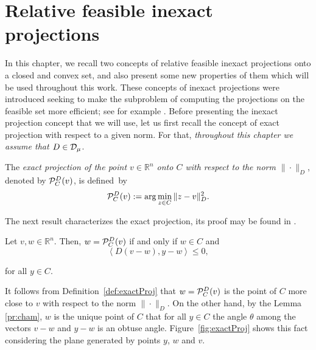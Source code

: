 \chapter{Relative feasible inexact projections} \label{chap:SubInexProj}
\thispagestyle{empty}



In this chapter, we recall two concepts  of relative feasible inexact projections onto a closed and convex set, and  also  present  some  new properties of them which will be used throughout this work. These  concepts  of inexact projections were    introduced seeking to make the subproblem of computing the projections on the feasible  set more efficient;  see for example \cite{BirginMartinezRaydan2003,SalzoVilla2012,VillaSalzo2013}. Before presenting the  inexact projection concept that we will use, let us first recall the concept of exact projection with respect to a given  norm.  For that, {\it throughout this chapter we assume that $D\in {\cal D}_{\mu}$}.

\begin{definition} \label{def:exactProj}
	The {\it exact  projection of the point $v\in \mathbb{R}^{n}$ onto $C$ with respect to the norm $\| \cdot \| _{D}$}, denoted by  ${\cal P}_{C}^{D}(v)$, is  defined~by
	\begin{equation}\label{eq:exactM}
		{\cal P}_{C}^{D}(v):=\arg \min _{z\in C}\|z-v\|^2_{D}.
	\end{equation}
\end{definition}

The next result  characterizes  the exact projection, its  proof may be found in  \cite[Theorem 3.14]{BauschkeLivro2014}.

\begin{lemma} \label{pr:cham}
	Let $v, w \in {\mathbb R}^n$.  Then,  $w={\cal P}_{C}^{D}(v)$ if and only if  $w\in C$ and
	\begin{equation}\label{eq:exactA}
		\left\langle D(v-w), y-w\right\rangle \leq  0,
	\end{equation}

	for all $y \in C.$
\end{lemma}
\begin{remark}\normalfont
	It follows from Definition~\ref{def:exactProj} that $w={\cal P}_{C}^{D}(v)$ is the point of $C$ more close to $v$ with respect to the norm $\| \cdot \| _{D}$. On the other hand, by the Lemma \ref{pr:cham}, $w$ is the unique point of $C$ that for all $y\in C$ the angle $\theta$ among the vectors $v-w$ and $y-w$ is an obtuse angle. Figure~\ref{fig:exactProj} shows this fact considering the plane generated by points $y$, $w$ and $v$.
\end{remark}\normalfont

